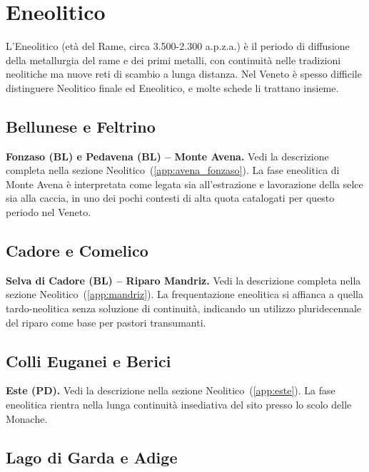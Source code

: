 \section{Eneolitico}
\label{app:eneolitico}

L'Eneolitico (età del Rame, circa 3.500-2.300 a.p.z.a.) è il periodo di diffusione della metallurgia del rame e dei primi metalli, con continuità nelle tradizioni neolitiche ma nuove reti di scambio a lunga distanza. Nel Veneto è spesso difficile distinguere Neolitico finale ed Eneolitico, e molte schede li trattano insieme.

\subsection{Bellunese e Feltrino}

\textbf{Fonzaso (BL) e Pedavena (BL) -- Monte Avena.} Vedi la descrizione completa nella sezione Neolitico~(\ref{app:avena_fonzaso}). La fase eneolitica di Monte Avena è interpretata come legata sia all'estrazione e lavorazione della selce sia alla caccia, in uno dei pochi contesti di alta quota catalogati per questo periodo nel Veneto.

\subsection{Cadore e Comelico}

\textbf{Selva di Cadore (BL) -- Riparo Mandriz.} Vedi la descrizione completa nella sezione Neolitico~(\ref{app:mandriz}). La frequentazione eneolitica si affianca a quella tardo-neolitica senza soluzione di continuità, indicando un utilizzo pluridecennale del riparo come base per pastori transumanti.

\subsection{Colli Euganei e Berici}

\textbf{Este (PD).} Vedi la descrizione nella sezione Neolitico~(\ref{app:este}). La fase eneolitica rientra nella lunga continuità insediativa del sito presso lo scolo delle Monache.

\subsection{Lago di Garda e Adige}

